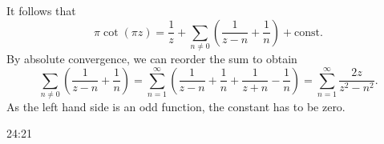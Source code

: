 \documentclass[a4paper,english]{article}
\begin{document}
It follows that
\begin{equation*}
    \pi \cot(\pi z)
    = \frac{1}{z} + \sum_{n \ne 0} \left(\frac{1}{z - n} + \frac{1}{n}\right) + \text{const.}
\end{equation*}
By absolute convergence, we can reorder the sum to obtain
\begin{equation*}
    \sum_{n \ne 0} \left(\frac{1}{z - n} + \frac{1}{n}\right) 
    = \sum_{n = 1}^{\infty} \left(\frac{1}{z - n} + \frac{1}{n} + \frac{1}{z + n} - \frac{1}{n}\right)
    = \sum_{n = 1}^{\infty} \frac{2 z}{z^2 - n^2}.
\end{equation*}
As the left hand side is an odd function, the constant has to be zero.

24:21

\clearpage
    


\printindex
\end{document}
